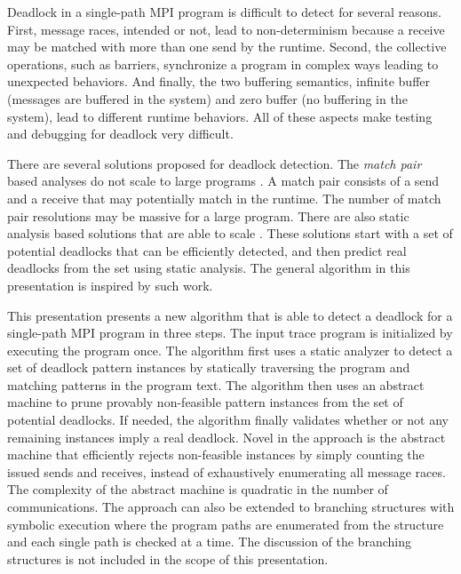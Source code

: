 Deadlock in a single-path MPI program is difficult to detect for several reasons. First, message races, intended or not, lead to non-determinism because a receive may be matched with more than one send by the runtime. Second, the collective operations, such as barriers, synchronize a program in complex ways leading to unexpected behaviors. And finally, the two buffering semantics, infinite buffer (messages are buffered in the system) and zero buffer (no buffering in the system), lead to different runtime behaviors. All of these aspects make testing and debugging for deadlock very difficult. 

There are several solutions proposed for deadlock detection. The \emph{match pair} based analyses do not scale to large programs \cite{DBLP:conf/ppopp/VakkalankaSGK08, DBLP:conf/sbmf/SharmaGB12, DBLP:conf/fm/ForejtKNS14}. A match pair consists of a send and a receive that may potentially match in the runtime. The number of match pair resolutions may be massive for a large program.
There are also static analysis based solutions that are able to scale \cite{DBLP:conf/sc/SharmaGB12, DBLP:conf/pldi/JoshiPSN09, Subodh:Dissertation}. These solutions start with a set of potential deadlocks that can be efficiently detected, and then predict real deadlocks from the set using static analysis.
The general algorithm in this presentation is inspired by such work.

This presentation presents a new algorithm that is able to detect a deadlock for a single-path MPI program in three steps. 
The input trace program is initialized by executing the program once.
The algorithm first uses a static analyzer to detect a set of deadlock pattern instances by statically traversing the program and matching patterns in the program text. The algorithm then uses an abstract machine to prune provably non-feasible pattern instances from the set of potential deadlocks. If needed, the algorithm finally validates whether or not any remaining instances imply a real deadlock. Novel in the approach is the abstract machine that efficiently rejects non-feasible instances by simply counting the issued sends and receives, instead of exhaustively enumerating all message races. The complexity of the abstract machine is quadratic in the number of communications. The approach can also be extended to branching structures with symbolic execution where the program paths are enumerated from the structure and each single path is checked at a time. The discussion of the branching structures is not included in the scope of this presentation.

